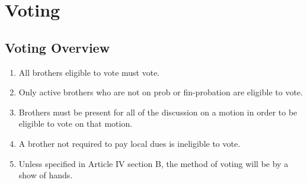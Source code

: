 
\chapter{Voting}

\section{Voting Overview}

	\begin{enumerate}
		\item All brothers eligible to vote must vote.

		\item Only active brothers who are not on \gls{prob} or \gls{fin-probation} are eligible to vote.

		\item Brothers must be present for all of the discussion on a motion in order to be eligible to vote on that motion.\label{voting-present} 

		\item A brother not required to pay local dues is ineligible to vote. %

		\item Unless specified in Article IV section B, the method of voting will be by a show of hands. 

	\end{enumerate}


